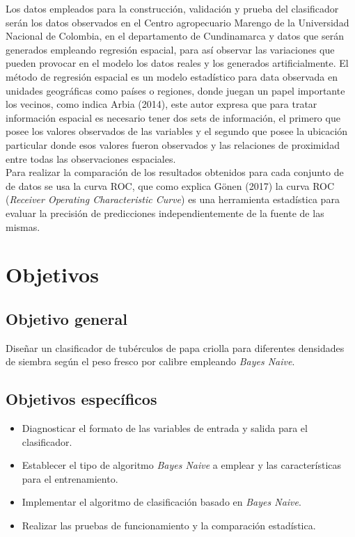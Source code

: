 Los datos empleados  para la construcción, validación y prueba del clasificador serán los datos observados en el Centro agropecuario Marengo de la Universidad Nacional de Colombia, en el departamento de Cundinamarca y datos que serán generados empleando regresión espacial, para así observar las variaciones que pueden provocar en el modelo los datos reales y los generados artificialmente. El método de regresión espacial es un modelo estadístico para data observada en unidades geográficas como países o regiones, donde juegan un papel importante los vecinos, como indica Arbia (2014), este autor expresa que para tratar información espacial es necesario tener dos sets de información, el primero que posee los valores observados de las variables y el segundo que posee la ubicación particular donde esos valores fueron observados y las relaciones de proximidad entre todas las observaciones espaciales.\\

Para realizar la comparación de los resultados obtenidos para cada conjunto de de datos se usa la curva ROC, que como explica Gönen (2017) la curva ROC (\textit{Receiver Operating Characteristic Curve}) es una herramienta estadística para evaluar la precisión de predicciones independientemente de la fuente de las mismas.

\section{Objetivos}

\subsection{Objetivo general}

Diseñar un clasificador de tubérculos de papa criolla para diferentes densidades de siembra según el peso fresco por calibre empleando \textit{Bayes Naive}.

\subsection{Objetivos espec\'ificos}

\begin{itemize}
\item  Diagnosticar el formato de las variables de entrada y salida para el clasificador.
\item	 Establecer el tipo de algoritmo \textit{Bayes Naive} a emplear  y las características para el entrenamiento.
\item  Implementar el algoritmo de clasificación basado en \textit{Bayes Naive}.
\item  Realizar las pruebas de funcionamiento y la comparación estadística.
\end{itemize}

